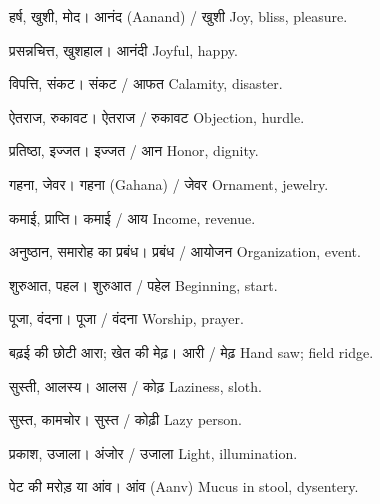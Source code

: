 %
{हर्ष, खुशी, मोद।}%
{आनंद (Aanand) / खुशी}%
{Joy, bliss, pleasure.}

%
{प्रसन्नचित्त, खुशहाल।}%
{आनंदी}%
{Joyful, happy.}

%
{विपत्ति, संकट।}%
{संकट / आफत}%
{Calamity, disaster.}

%
{ऐतराज, रुकावट।}%
{ऐतराज / रुकावट}%
{Objection, hurdle.}

%
{प्रतिष्ठा, इज्जत।}%
{इज्जत / आन}%
{Honor, dignity.}

%
{गहना, जेवर।}%
{गहना (Gahana) / जेवर}%
{Ornament, jewelry.}

%
{कमाई, प्राप्ति।}%
{कमाई / आय}%
{Income, revenue.}

%
{अनुष्ठान, समारोह का प्रबंध।}%
{प्रबंध / आयोजन}%
{Organization, event.}

%
{शुरुआत, पहल।}%
{शुरुआत / पहेल}%
{Beginning, start.}

%
{पूजा, वंदना।}%
{पूजा / वंदना}%
{Worship, prayer.}

%
{बढ़ई की छोटी आरा; खेत की मेढ़।}%
{आरी / मेढ़}%
{Hand saw; field ridge.}

%
{सुस्ती, आलस्य।}%
{आलस / कोढ़}%
{Laziness, sloth.}

%
{सुस्त, कामचोर।}%
{सुस्त / कोढ़ी}%
{Lazy person.}

%
{प्रकाश, उजाला।}%
{अंजोर / उजाला}%
{Light, illumination.}

%
{पेट की मरोड़ या आंव।}%
{आंव (Aanv)}%
{Mucus in stool, dysentery.}

